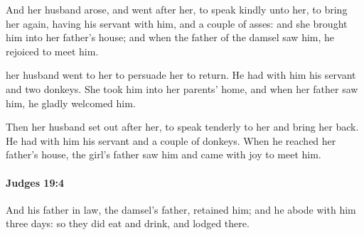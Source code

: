 			\begin{versebox}
					\item[BHS] 
					\item[ASV] And her husband arose, and went after her, to speak kindly unto her, to bring her again, having his servant with him, and a couple of asses: and she brought him into her father's house; and when the father of the damsel saw him, he rejoiced to meet him.
					\item[NIV] her husband went to her to persuade her to return. He had with him his servant and two donkeys. She took him into her parents’ home, and when her father saw him, he gladly welcomed him.
					\item[NRSV] Then her husband set out after her, to speak tenderly to her and bring her back. He had with him his servant and a couple of donkeys. When he reached her father’s house, the girl’s father saw him and came with joy to meet him.
			\end{versebox}

		\paragraph{Judges 19:4} %
			\label{JUDGES-19-4}

			And his father in law, the damsel’s father, retained him; and he abode with him three days: so they did eat and drink, and lodged there.

